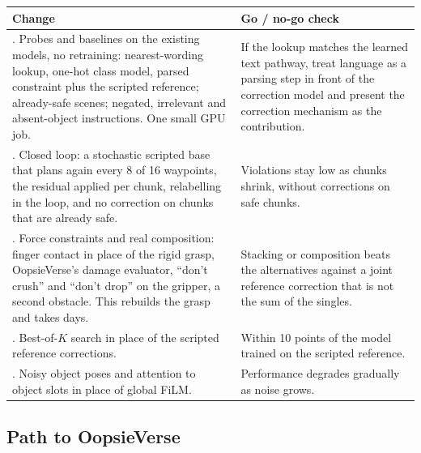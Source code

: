 \documentclass[11pt]{article}
\begin{document}
\begin{center}
\small
\begin{tabularx}{\linewidth}{@{}>{\raggedright\arraybackslash}p{7.2cm}Y@{}}
\toprule
Change & Go / no-go check \\
. Probes and baselines on the existing models, no retraining: nearest-wording lookup, one-hot class
model, parsed constraint plus the scripted reference; already-safe scenes; negated, irrelevant and
absent-object instructions. One small GPU job. &
If the lookup matches the learned text pathway, treat language as a parsing step in front of the
correction model and present the correction mechanism as the contribution. \\
. Closed loop: a stochastic scripted base that plans again every 8 of 16 waypoints, the residual applied
per chunk, relabelling in the loop, and no correction on chunks that are already safe. &
Violations stay low as chunks shrink, without corrections on safe chunks. \\
. Force constraints and real composition: finger contact in place of the rigid grasp, OopsieVerse's
damage evaluator, ``don't crush'' and ``don't drop'' on the gripper, a second obstacle. This rebuilds the
grasp and takes days. &
Stacking or composition beats the alternatives against a joint reference correction that is not the sum
of the singles. \\
. Best-of-$K$ search in place of the scripted reference corrections. &
Within 10 points of the model trained on the scripted reference. \\
. Noisy object poses and attention to object slots in place of global FiLM. &
Performance degrades gradually as noise grows. \\
\bottomrule
\end{tabularx}
\end{center}

\subsection{Path to OopsieVerse}
\end{document}

